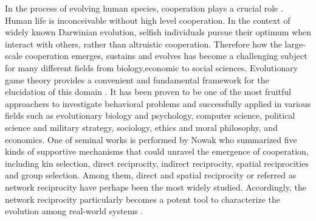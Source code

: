 \documentclass[preprint,12pt,3p]{elsarticle}
\begin{document}
In the process of evolving human species, cooperation plays a
crucial role \cite{hammerstein2003genetic,hofbauer1998evolutionary}.
Human life is inconceivable without high level cooperation.
In the context of widely known Darwinian evolution, selfish individuals pursue
their optimum when interact with others, rather than altruistic cooperation.
Therefore how the large-scale cooperation emerges, sustains and evolves has become a
challenging subject for many different fields from biology,economic to social sciences.
    Evolutionary game theory\cite{smith1982evolution,nowakevolutionary} provides a convenient
and fundamental framework for the elucidation of this domain
\cite{Trivers-18254,RapoportChammah-18253,FundenbergMaskin-18255,KendallYao-18256}.
It has been proven to be one of the most fruitful approachers to investigate behavioral problems and successfully applied in various fields such as evolutionary biology and psychology,
computer science, political science and military strategy, sociology,
ethics and moral philosophy, and economics\cite{NowakSigmund-18283,PoncelaGómez-Gardeñes-18278,Tanimoto-18277,
ImhofFudenberg-18279,SantosPacheco-18280,Gracia-LázaroCuesta-18281,AntonioniTomassini-18282,
TanimotoBrede-18276}.
    One of seminal works is performed by Nowak \cite{Nowak-18317}who summarized five kinds of supportive mechanisms 
that could unravel the emergence of cooperation, including kin selection, direct reciprocity,
indirect reciprocity, spatial reciprocities and group selection.
Among them, direct and spatial reciprocity or referred as network reciprocity have perhaps been the
most widely studied.
Accordingly, the network reciprocity particularly  becomes a potent tool to characterize the evolution
among real-world systems \cite{boccaletti2006complex}.
\end{document}
